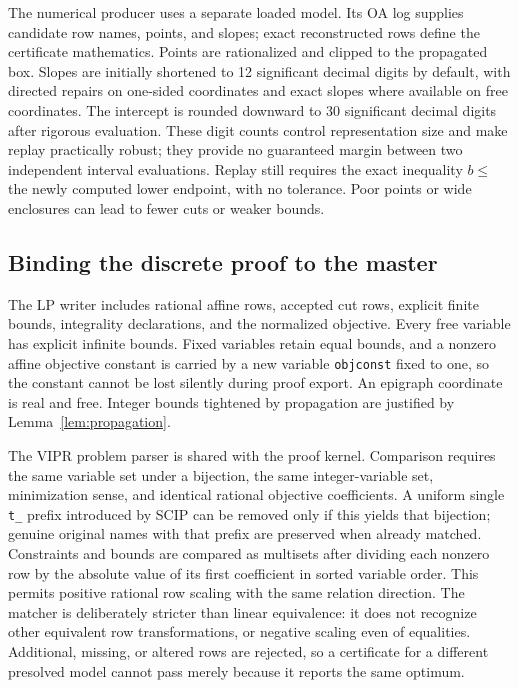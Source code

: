 The numerical producer uses a separate loaded model. Its OA log supplies candidate row names, points, and slopes; exact reconstructed rows define the certificate mathematics. Points are rationalized and clipped to the propagated box. Slopes are initially shortened to 12 significant decimal digits by default, with directed repairs on one-sided coordinates and exact slopes where available on free coordinates. The intercept is rounded downward to 30 significant decimal digits after rigorous evaluation. These digit counts control representation size and make replay practically robust; they provide no guaranteed margin between two independent interval evaluations. Replay still requires the exact inequality $b\leq$ the newly computed lower endpoint, with no tolerance. Poor points or wide enclosures can lead to fewer cuts or weaker bounds.

\subsection{Binding the discrete proof to the master}
\label{sec:master-identity}
The LP writer includes rational affine rows, accepted cut rows, explicit finite bounds, integrality declarations, and the normalized objective. Every free variable has explicit infinite bounds. Fixed variables retain equal bounds, and a nonzero affine objective constant is carried by a new variable \texttt{objconst} fixed to one, so the constant cannot be lost silently during proof export. An epigraph coordinate is real and free. Integer bounds tightened by propagation are justified by Lemma~\ref{lem:propagation}.

The VIPR problem parser is shared with the proof kernel. Comparison requires the same variable set under a bijection, the same integer-variable set, minimization sense, and identical rational objective coefficients. A uniform single \texttt{t\_} prefix introduced by SCIP can be removed only if this yields that bijection; genuine original names with that prefix are preserved when already matched. Constraints and bounds are compared as multisets after dividing each nonzero row by the absolute value of its first coefficient in sorted variable order. This permits positive rational row scaling with the same relation direction. The matcher is deliberately stricter than linear equivalence: it does not recognize other equivalent row transformations, or negative scaling even of equalities. Additional, missing, or altered rows are rejected, so a certificate for a different presolved model cannot pass merely because it reports the same optimum.

